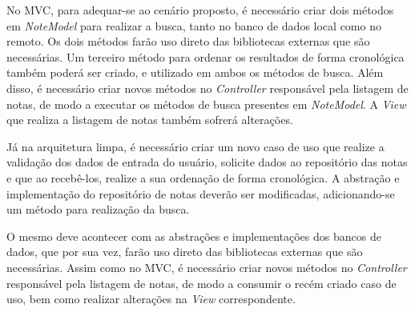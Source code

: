 No MVC, para adequar-se ao cenário proposto, é necessário criar dois métodos em \emph{NoteModel} para realizar a busca, tanto no banco de dados local como no remoto.
Os dois métodos farão uso direto das bibliotecas externas que são necessárias.
Um terceiro método para ordenar os resultados de forma cronológica também poderá ser criado, e utilizado em ambos os métodos de busca.
Além disso, é necessário criar novos métodos no \emph{Controller} responsável pela listagem de notas, de modo a executar os métodos de busca presentes em \emph{NoteModel}.
A \emph{View} que realiza a listagem de notas também sofrerá alterações.

Já na arquitetura limpa, é necessário criar um novo caso de uso que realize a validação dos dados de entrada do usuário, solicite dados ao repositório das notas e que ao recebê-los, realize a sua ordenação de forma cronológica.
A abstração e implementação do repositório de notas deverão ser modificadas, adicionando-se um método para realização da busca.

O mesmo deve acontecer com as abstrações e implementações dos bancos de dados, que por sua vez, farão uso direto das bibliotecas externas que são necessárias.
Assim como no MVC, é necessário criar novos métodos no \emph{Controller} responsável pela listagem de notas, de modo a consumir o recém criado caso de uso, bem como realizar alterações na \emph{View} correspondente.